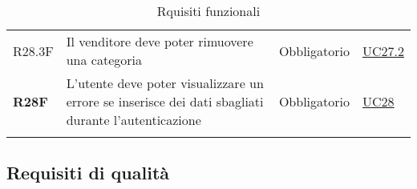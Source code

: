 \begin{center}
\begin{longtable}[!h]{p{50px} p{210px} p{80px} p{50px}}
        R28.3F                                & Il venditore deve poter rimuovere una categoria                                                     & Obbligatorio             & \hyperref[sec:UC27.2]{UC27.2}                \\
        \textbf{R28F}                         & L'utente deve poter visualizzare un errore se inserisce dei dati sbagliati durante l'autenticazione & Obbligatorio             & \hyperref[sec:UC28]{UC28}                    \\
        \rowcolor{white}\caption{Rquisiti funzionali}
    \end{longtable}
\end{center}

\newpage
\subsection{Requisiti di qualità}
